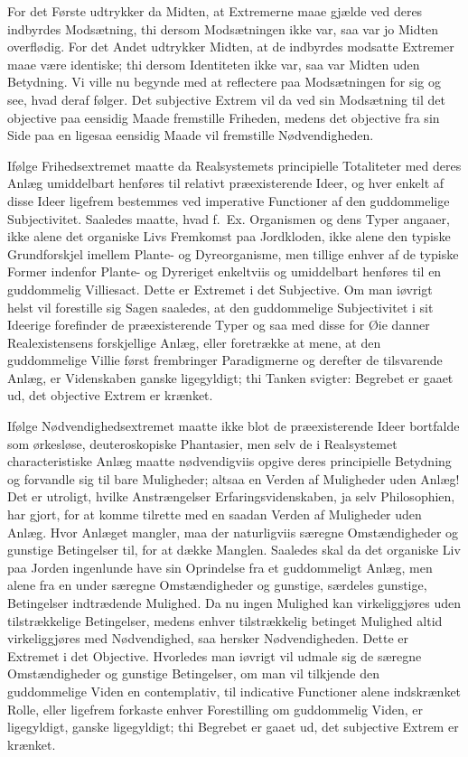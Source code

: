 \documentclass[12pt]{book}
\newcommand{\opage}[1]{\marginnote{\footnotesize\textit{[#1]}}}
\begin{document}
For det Første udtrykker da Midten, at Extremerne maae gjælde ved deres indbyrdes Modsætning, thi dersom Modsætningen ikke var, saa var jo Midten overflødig. For det
\opage{441}Andet udtrykker Midten, at de indbyrdes modsatte Extremer maae være identiske; thi dersom Identiteten ikke var, saa var Midten uden Betydning. Vi ville nu begynde med at reflectere paa Modsætningen for sig og see, hvad deraf følger. Det subjective Extrem vil da ved sin Modsætning til det objective paa eensidig Maade fremstille Friheden, medens det objective fra sin Side paa en ligesaa eensidig Maade vil fremstille Nødvendigheden.

Ifølge Frihedsextremet maatte da Realsystemets principielle Totaliteter med deres Anlæg umiddelbart henføres til relativt præexisterende Ideer, og hver enkelt af disse Ideer ligefrem bestemmes ved imperative Functioner af den guddommelige Subjectivitet. Saaledes maatte, hvad f.\ Ex. Organismen og dens Typer angaaer, ikke alene det organiske Livs Fremkomst paa Jordkloden, ikke alene den typiske Grundforskjel imellem Plante- og Dyreorganisme, men tillige enhver af de typiske Former indenfor Plante- og Dyreriget enkeltviis og umiddelbart henføres til en guddommelig Villiesact. Dette er Extremet i det Subjective. Om man iøvrigt helst vil forestille sig Sagen saaledes, at den guddommelige Subjectivitet i sit Ideerige forefinder de præexisterende Typer og saa med disse for Øie danner Realexistensens forskjellige Anlæg, eller foretrække at mene, at den guddommelige Villie først frembringer Paradigmerne og derefter de tilsvarende Anlæg, er Videnskaben ganske ligegyldigt; thi Tanken svigter: Begrebet er gaaet ud, det objective Extrem er krænket.

Ifølge Nødvendighedsextremet maatte ikke blot de præexisterende Ideer bortfalde som ørkesløse, deuteroskopiske Phantasier, men selv de i Realsystemet characteristiske Anlæg maatte nødvendigviis opgive deres principielle Betydning og forvandle sig til bare Muligheder; altsaa en Verden af Muligheder uden Anlæg! Det er utroligt, hvilke Anstrængelser Erfaringsvidenskaben, ja selv Philosophien, har gjort, for at komme tilrette med en saadan Verden af Muligheder uden Anlæg.
\opage{442}Hvor Anlæget mangler, maa der naturligviis særegne Omstændigheder og gunstige Betingelser til, for at dække Manglen. Saaledes skal da det organiske Liv paa Jorden ingenlunde have sin Oprindelse fra et guddommeligt Anlæg, men alene fra en under særegne Omstændigheder og gunstige, særdeles gunstige, Betingelser indtrædende Mulighed. Da nu ingen Mulighed kan virkeliggjøres uden tilstrækkelige Betingelser, medens enhver tilstrækkelig betinget Mulighed altid virkeliggjøres med Nødvendighed, saa hersker Nødvendigheden. Dette er Extremet i det Objective. Hvorledes man iøvrigt vil udmale sig de særegne Omstændigheder og gunstige Betingelser, om man vil tilkjende den guddommelige Viden en contemplativ, til indicative Functioner alene indskrænket Rolle, eller ligefrem forkaste enhver Forestilling om guddommelig Viden, er ligegyldigt, ganske ligegyldigt; thi Begrebet er gaaet ud, det subjective Extrem er krænket.
\end{document}
